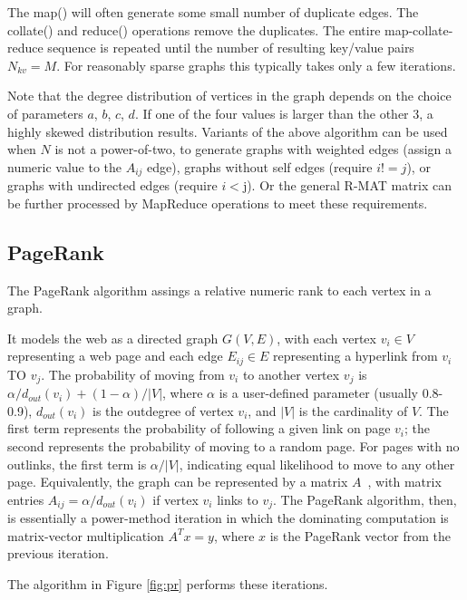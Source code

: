 The map() will often generate some small number of duplicate edges.
The collate() and reduce() operations remove the duplicates.  The
entire map-collate-reduce sequence is repeated until the number of
resulting key/value pairs $N_{kv} = M$.  For reasonably sparse graphs
this typically takes only a few iterations.

Note that the degree distribution of vertices in the graph depends on
the choice of parameters $a$, $b$, $c$, $d$.  If one of the four
values is larger than the other 3, a highly skewed distribution
results.  Variants of the above algorithm can be used when $N$ is not
a power-of-two, to generate graphs with weighted edges (assign a
numeric value to the $A_{ij}$ edge), graphs without self edges
(require $i != j$), or graphs with undirected edges (require $i < $j).
Or the general R-MAT matrix can be further processed by MapReduce
operations to meet these requirements.

\subsection{PageRank}

The PageRank algorithm assings a relative numeric rank to each
vertex in a graph.

It models the web as a directed graph $G(V,E)$, with each vertex $v_i
\in V$ representing a web page and each edge $E_{ij} \in E$
representing a hyperlink from $v_i$ TO $v_j$.  The probability of
moving from $v_i$ to another vertex $v_j$ is $\alpha/d_{out}(v_i) +
(1-\alpha)/|V|$, where $\alpha$ is a user-defined parameter (usually
0.8-0.9), $d_{out}(v_i)$ is the outdegree of vertex $v_i$, and $|V|$ is
the cardinality of $V$.  The first term represents the probability of
following a given link on page $v_i$; the second represents the
probability of moving to a random page.  For pages with no outlinks,
the first term is $\alpha/|V|$, indicating equal likelihood to move to
any other page.  Equivalently, the graph can be represented by a
matrix $A$~\cite{LangvilleMeyer05a}, with matrix entries $A_{ij} =
\alpha/d_{out}(v_i)$ if vertex $v_i$ links to $v_j$.  The PageRank
algorithm, then, is essentially a power-method iteration in which the
dominating computation is matrix-vector multiplication $A^T x=y$,
where $x$ is the PageRank vector from the previous iteration.

The algorithm in Figure \ref{fig:pr} performs these
iterations.

